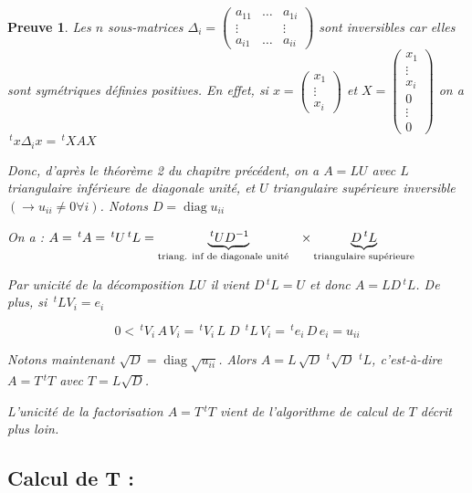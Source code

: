 \documentclass[a4paper,11pt]{article}
\newcommand{\tpo}[1]{\,^t#1}
\DeclareMathOperator{\diag}{diag}
\theoremstyle{plain} %
\newtheorem{preuve}{Preuve}
\begin{document}
\begin{preuve}
    Les $n$ sous-matrices 
$\Delta _i =
\begin{pmatrix}
    a_{11} & \dots & a_{1i} \\
    \vdots & & \vdots \\
    a_{i1} & \dots & a_{ii}
\end{pmatrix}$
sont inversibles car elles sont symétriques définies positives. En effet, si 
$x =
\begin{pmatrix}
    x_1 \\
    \vdots \\
    x_i
\end{pmatrix}
$
et
$X =
\begin{pmatrix}
    x_1 \\
    \vdots \\
    x_i \\
    0 \\
    \vdots \\
    0
\end{pmatrix}
$
on a $\tpo{x} \Delta_i x = \tpo{X}AX$

Donc, d'après le théorème 2 du chapitre précédent, on a $A = LU$ avec $L$ triangulaire
inférieure de diagonale unité, et $U$ triangulaire supérieure inversible $(\rightarrow u_{ii} \ne 0 \forall i)$.
Notons $D = \diag{u_{ii}}$

On a : $A = \tpo{A} = \tpo{U} \tpo{L} = \underbrace{\tpo{U} D^{-1}}_\text{triang. inf de diagonale unité \hspace{0.2cm}}
\times
\underbrace{D \tpo{L}}_\text{triangulaire supérieure}$

Par unicité de la décomposition $LU$ il vient $D\tpo{L} = U$ et donc $A = L D \tpo{L}$. De plus, si $\tpo{L} V_i = e_i$

\[
    0 < \tpo{V_i} \, A \, V_i = \tpo{V_i} \, L \; D \; \tpo{L} \, V_i = \tpo{e_i} \, D \, e_i = u_{ii}
\]

Notons maintenant $\sqrt{D} = \diag{\sqrt{u_{ii}}}$. Alors $A = L \, \sqrt{D} \, \tpo{\sqrt{D}} \, \tpo{L}$,
c'est-à-dire $A = T \tpo{T}$ avec $T = L \sqrt{D}$.

L'unicité de la factorisation $A = T \tpo{T}$ vient de l'algorithme de calcul de $T$ décrit plus loin.
\end{preuve}


\subsection*{Calcul de T :}
\end{document}
